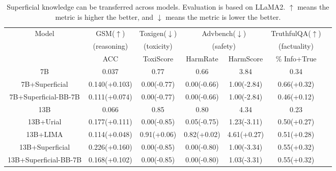 \begin{table*}[t]
\begin{center}

\begin{tabular}{ccccccc}
\toprule
\multirow{3}{*}{Model} & GSM($\uparrow$) & Toxigen($\downarrow$) & \multicolumn{2}{c}{Advbench($\downarrow$)} & TruthfulQA($\uparrow$)  \\
  ~ & (reasoning) & (toxicity) &  \multicolumn{2}{c}{(safety)} &  (factuality) \\
~&ACC & ToxiScore & HarmRate & HarmScore & \% Info+True \\
\midrule
 7B                   & 0.037         & 0.77        & 0.66        &          3.84        & 0.34 \\
 7B+Superficial        & 0.140(+0.103) & 0.00(-0.77) & 0.00(-0.66) & 1.00(-2.84) & 0.66(+0.32) \\
7B+Superficial-BB-7B        & 0.111(+0.074) & 0.00(-0.77) & 0.00(-0.66) & 1.00(-2.84) & 0.46(+0.12) \\

\midrule
 13B  & 0.066         & 0.85        & 0.80        & 4.34 & 0.23 \\
  13B+Urial                           & 0.177(+0.111) & 0.00(-0.85) & 0.05(-0.75) & 1.23(-3.11) & 0.50(+0.27) \\
13B+LIMA                           & 0.114(+0.048) & 0.91(+0.06) & 0.82(+0.02) & 4.61(+0.27) & 0.51(+0.28) \\
13B+Superficial        & 0.226(+0.160) & 0.00(-0.85) & 0.00(-0.80) & 1.00(-3.34) & 0.55(+0.32) \\
  
  13B+Superficial-BB-7B        & 0.168(+0.102) & 0.00(-0.85) & 0.00(-0.80) & 1.03(-3.31) & 0.55(+0.32)  \\
\bottomrule
\end{tabular}

\end{center}\caption{Superficial knowledge can be transferred across models. Evaluation is based on LLaMA2. $\uparrow$ means the metric is higher the better, and $\downarrow$ means the metric is lower the better.}\label{tab:bb}

\end{table*}


